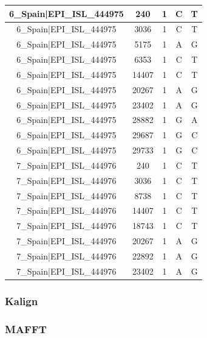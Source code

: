 \documentclass[a4paper,10pt]{article}
\begin{document}
\begin{longtable}{@{}ccccc@{}}
6\_Spain|EPI\_ISL\_444975 & 240 & 1 & C & T \\* \midrule
6\_Spain|EPI\_ISL\_444975 & 3036 & 1 & C & T \\* \midrule
6\_Spain|EPI\_ISL\_444975 & 5175 & 1 & A & G \\* \midrule
6\_Spain|EPI\_ISL\_444975 & 6353 & 1 & C & T \\* \midrule
6\_Spain|EPI\_ISL\_444975 & 14407 & 1 & C & T \\* \midrule
6\_Spain|EPI\_ISL\_444975 & 20267 & 1 & A & G \\* \midrule
6\_Spain|EPI\_ISL\_444975 & 23402 & 1 & A & G \\* \midrule
6\_Spain|EPI\_ISL\_444975 & 28882 & 1 & G & A \\* \midrule
6\_Spain|EPI\_ISL\_444975 & 29687 & 1 & G & C \\* \midrule
6\_Spain|EPI\_ISL\_444975 & 29733 & 1 & G & C \\* \midrule
7\_Spain|EPI\_ISL\_444976 & 240 & 1 & C & T \\* \midrule
7\_Spain|EPI\_ISL\_444976 & 3036 & 1 & C & T \\* \midrule
7\_Spain|EPI\_ISL\_444976 & 8738 & 1 & C & T \\* \midrule
7\_Spain|EPI\_ISL\_444976 & 14407 & 1 & C & T \\* \midrule
7\_Spain|EPI\_ISL\_444976 & 18743 & 1 & C & T \\* \midrule
7\_Spain|EPI\_ISL\_444976 & 20267 & 1 & A & G \\* \midrule
7\_Spain|EPI\_ISL\_444976 & 22892 & 1 & A & G \\* \midrule
7\_Spain|EPI\_ISL\_444976 & 23402 & 1 & A & G \\* \bottomrule
\end{longtable}

\newpage
\subsubsection{Kalign}



\newpage
\subsubsection{MAFFT}
\restoregeometry
\end{document}
